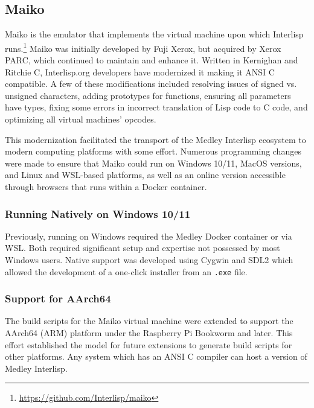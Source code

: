 \documentclass[sigconf]{acmart}
\begin{document}
\subsection{Maiko}

Maiko is the emulator that implements the virtual machine upon which Interlisp runs.\footnote{\url{https://github.com/Interlisp/maiko}} Maiko was initially developed by Fuji Xerox, but acquired by Xerox PARC, which continued to maintain and enhance it. Written in Kernighan and Ritchie C, Interlisp.org developers have modernized it making it ANSI C compatible. A few of these modifications included resolving issues of signed vs. unsigned characters, adding prototypes for functions, ensuring all parameters have types, fixing some errors in incorrect translation of Lisp code to C code, and optimizing all virtual machines' opcodes. 

This modernization facilitated the transport of the Medley Interlisp ecosystem to modern computing platforms with some effort. Numerous programming changes were made to ensure that Maiko could run on Windows 10/11, MacOS versions, and Linux and WSL-based platforms, as well as an online version accessible through browsers that runs within a Docker container.
 
\subsubsection{Running Natively on Windows 10/11}

Previously, running on Windows required the Medley Docker container or via WSL. Both required significant setup and expertise not possessed by most Windows users. Native support was developed using Cygwin and SDL2 which allowed the development of a one-click installer from an \texttt{.exe} file.

\subsubsection{Support for AArch64}

The build scripts for the Maiko virtual machine were extended to support the AArch64 (ARM) platform under the Raspberry Pi Bookworm and later. This effort established the model for future extensions to generate build scripts for other platforms. Any system which has an ANSI C compiler can host a version of Medley Interlisp.

\end{document}
